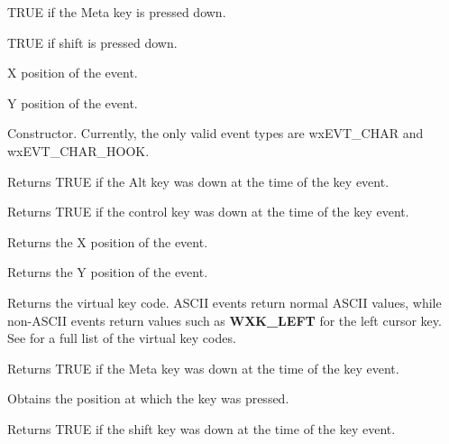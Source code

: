 
TRUE if the Meta key is pressed down.



TRUE if shift is pressed down.



X position of the event.



Y position of the event.



Constructor. Currently, the only valid event types are wxEVT\_CHAR and wxEVT\_CHAR\_HOOK.



Returns TRUE if the Alt key was down at the time of the key event.



Returns TRUE if the control key was down at the time of the key event.



Returns the X position of the event.



Returns the Y position of the event.



Returns the virtual key code. ASCII events return normal ASCII values,
while non-ASCII events return values such as {\bf WXK\_LEFT} for the
left cursor key. See  for a full list of the virtual key codes.



Returns TRUE if the Meta key was down at the time of the key event.




Obtains the position at which the key was pressed.



Returns TRUE if the shift key was down at the time of the key event.


